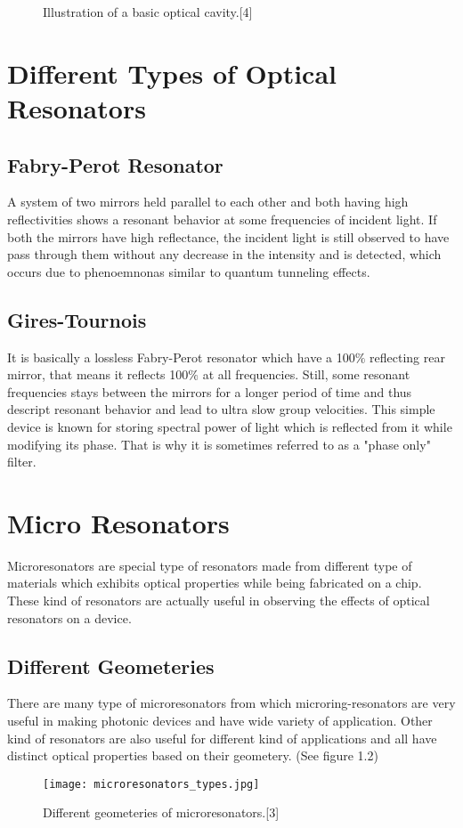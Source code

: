 \begin{figure}[h]
\centering
{}
\caption{Illustration of a basic optical cavity.[4]}
\end{figure}

\newpage
\section{Different Types of Optical Resonators}
\subsection{Fabry-Perot Resonator}
A system of two mirrors held parallel to each other and both having high reflectivities shows a resonant behavior at some frequencies of incident light. If both the mirrors have high reflectance, the incident light is still observed to have pass through them without any decrease in the intensity and is detected, which occurs due to phenoemnonas similar to quantum tunneling effects.

\subsection{Gires-Tournois}
It is basically a lossless Fabry-Perot resonator which have a 100$\%$ reflecting rear mirror, that means it reflects 100$\%$ at all frequencies. Still, some resonant frequencies stays between the mirrors for a longer period of time and thus descript resonant behavior and lead to ultra slow group velocities. This simple device is known for storing spectral power of light which is reflected from it while modifying its phase. That is why it is sometimes referred to as a "phase only" filter.


\section{Micro Resonators}
Microresonators are special type of resonators made from different type of materials which exhibits optical properties while being fabricated on a chip. These kind of resonators are actually useful in observing the effects of optical resonators on a device.
\subsection{Different Geometeries}
There are many type of microresonators from which microring-resonators are very useful in making photonic devices and have wide variety of application. Other kind of resonators are also useful for different kind of applications and all have distinct optical properties based on their geometery. (See figure 1.2)
\begin{figure}[h]
\centering
\texttt{[image: microresonators\_types.jpg]}
\caption{Different geometeries of microresonators.[3]}
\end{figure}



